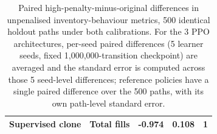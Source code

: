 \begin{table}[ht]
\begin{tabular}{llrrr}
Supervised clone & Total fills & -0.974 & 0.108 & 1 \\
\bottomrule
\end{tabular}
\caption{Paired high-penalty-minus-original differences in unpenalised inventory-behaviour metrics, 500 identical holdout paths under both calibrations. For the 3 PPO architectures, per-seed paired differences (5 learner seeds, fixed 1,000,000-transition checkpoint) are averaged and the standard error is computed across those 5 seed-level differences; reference policies have a single paired difference over the 500 paths, with its own path-level standard error.}
\label{tab:ips-paired-diffs}
\end{table}

